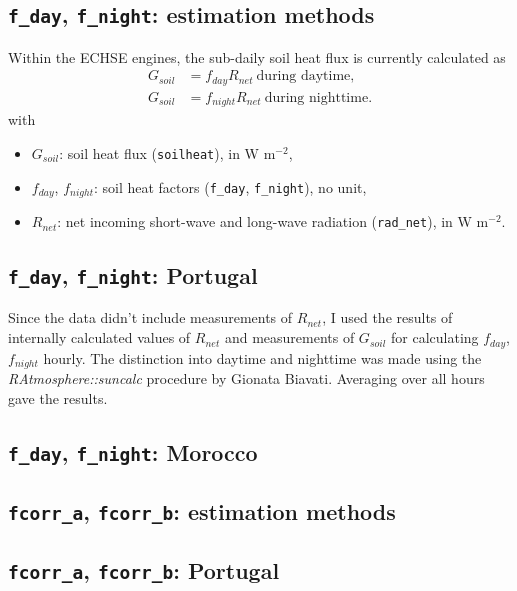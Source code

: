 \documentclass{scrreprt}
\begin{document}
\subsection{\texttt{f\_day}, \texttt{f\_night}: estimation methods} \label{ssec:parest_rad_fmethods}

Within the ECHSE engines, the sub-daily soil heat flux is currently calculated as
\begin{align}
  G_{soil} &= f_{day} R_{net} ~ \text{during daytime}, \label{eq:F1} \\
  G_{soil} &= f_{night} R_{net} ~ \text{during nighttime}. \label{eq:F2}
\end{align}
%
with
\begin{itemize}
  \item[] $G_{soil}$: soil heat flux (\verb!soilheat!), in W m$^{-2}$,
  \item[] $f_{day}$, $f_{night}$: soil heat factors (\verb!f_day!, \verb!f_night!), no unit,
  \item[] $R_{net}$: net incoming short-wave and long-wave radiation (\verb!rad_net!), in W m$^{-2}$.
\end{itemize}

\subsection{\texttt{f\_day}, \texttt{f\_night}: Portugal} \label{ssec:parest_rad_fportugal}

Since the data didn't include measurements of $R_{net}$, I used the results of internally calculated values of $R_{net}$ and measurements of $G_{soil}$ for calculating $f_{day}$, $f_{night}$ hourly.
The distinction into daytime and nighttime was made using the \emph{RAtmosphere::suncalc} procedure by Gionata Biavati.
Averaging over all hours gave the results.

\subsection{\texttt{f\_day}, \texttt{f\_night}: Morocco} \label{ssec:parest_rad_fmorocco}

\subsection{\texttt{fcorr\_a}, \texttt{fcorr\_b}: estimation methods} \label{ssec:parest_rad_fcorrmethods}

\subsection{\texttt{fcorr\_a}, \texttt{fcorr\_b}: Portugal} \label{ssec:parest_rad_fcorrportugal}
\end{document}
